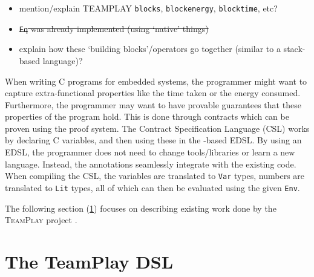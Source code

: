 \begin{itemize}
	\item mention/explain TEAMPLAY \texttt{blocks}, \texttt{blockenergy},
          \texttt{blocktime}, etc?
	\item \sout{\texttt{Eq} was already implemented (using `native' things)}
    \item explain how these `building blocks'/operators go together (similar to
    	  a stack-based language)?
\end{itemize}

When writing C programs for embedded systems, the programmer might want to capture extra-functional properties like the time taken or the energy consumed. Furthermore, the programmer may want to have provable guarantees that these properties of the program hold. This is done through contracts which can be proven using the \Idris proof system. The Contract Specification Language (CSL) works by declaring C variables, and then using these in the \Idris-based EDSL. By using an EDSL, the programmer does not need to change tools/libraries or learn a new language. Instead, the annotations seamlessly integrate with the existing code. When compiling the CSL, the variables are translated to \texttt{Var} types, numbers are translated to \texttt{Lit} types, all of which can then be evaluated using the given \texttt{Env}.
\\\par

The following section (\ref{des:tp-dsl}) focuses on describing existing work done by the \textsc{TeamPlay} project \cite{teamplay:d1.1}.

\section{The TeamPlay DSL}\label{des:tp-dsl}
